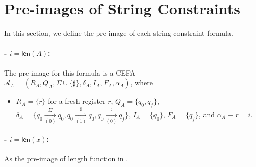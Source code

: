 \documentclass[12pt]{article}
\newcommand*{\aut}{\mathcal{A}}
\newcommand{\arrconcat}{\sharp}
\newcommand{\mylen}{\mathsf{len}}
\newcommand{\myset}[1]{\{#1\}}
\theoremstyle{remark}
\begin{document}

\section{Pre-images of String Constraints}\label{sec:pre_image}
In this section, we define the pre-image of each string constraint formula.
\paragraph{- $i = \mylen(A)$:} The pre-image for this formula is a CEFA $\aut_A=(R_A, Q_A, \Sigma\cup\{\arrconcat\}, \delta_A, I_A, F_A, \alpha_A)$, where
\begin{itemize}
    \item $R_A = \{r\}$ for a fresh register $r$, $Q_A = \{q_0, q_f\}$, $\delta_A = \myset{q_0\xrightarrow[(0)]{\Sigma}q_0, q_0\xrightarrow[(1)]{\sharp}q_0, q_0\xrightarrow[(0)]{\arrconcat}q_f }$, $I_A = \myset{q_0}$, $F_A = \myset{q_f}$, and $\alpha_A \equiv r = i$.
\end{itemize}

\paragraph{- $i = \mylen(x)$:} As the pre-image of length function in \cite{atva2020}.
\end{document}

